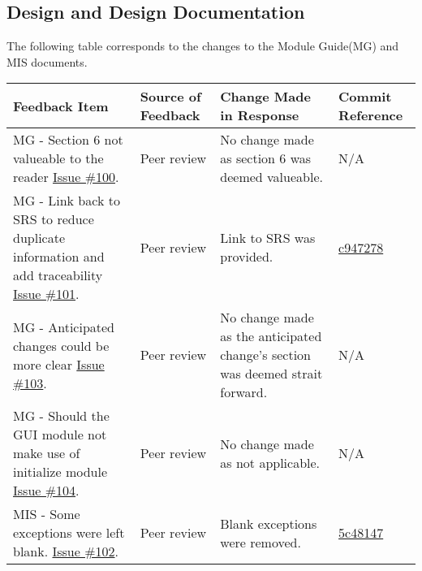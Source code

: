 \documentclass{article}
\begin{document}
\subsection{Design and Design Documentation}
The following table corresponds to the changes to the Module Guide(MG) and MIS documents. 
\begin{longtable}{|p{4cm}|p{1.5cm}|p{4cm}|p{1.5cm}|}
    \hline
    \textbf{Feedback Item} & \textbf{Source of Feedback} & \textbf{Change Made in Response} & \textbf{Commit Reference} \\
    \hline
    \endfirsthead
    \hline
    \endhead
    \hline
    \endfoot
    \hline
    \endlastfoot
    MG - Section 6 not valueable to the reader \href{https://github.com/gr812b/CVT-Simulator/issues/100}{Issue \#100}. & Peer review  & No change made as section 6 was deemed valueable.& N/A \\
    \hline
    MG - Link back to SRS to reduce duplicate information and add traceability \href{https://github.com/gr812b/CVT-Simulator/issues/101}{Issue \#101}. & Peer review  & Link to SRS was provided.& 
    \href{https://github.com/gr812b/CVT-Simulator/commit/c9472786934ffacbad18ab7b65ed8313451e8ada}{c947278} \\ 
    \hline
    MG - Anticipated changes could be more clear \href{https://github.com/gr812b/CVT-Simulator/issues/103}{Issue \#103}. & Peer review  & No change made as the anticipated change's section was deemed strait forward.& N/A \\
    \hline

    MG - Should the GUI module not make use of initialize module \href{https://github.com/gr812b/CVT-Simulator/issues/104}{Issue \#104}. & Peer review  & No change made as not applicable. & N/A \\
    \hline

    MIS - Some exceptions were left blank. \href{https://github.com/gr812b/CVT-Simulator/issues/102}{Issue \#102}. & Peer review  & Blank exceptions were removed. & 
    \href{https://github.com/gr812b/CVT-Simulator/commit/5c48147b343cc93bd576ef4c185cf6708cb6ad26}{5c48147} \\ 

\end{longtable}
\end{document}
